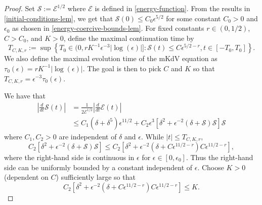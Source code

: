 \begin{proof}
	
	Set \(\mathcal S := \mathcal E ^{1/2}\) where \(\mathcal E\) is defined in \cref{energy-function}. From the results in \cref{initial-conditions-lem}, we get that \(\mathcal S(0) \leq C_0 \epsilon^{5/2}\) for some constant \(C_0 > 0\) and \(\epsilon_0\) as chosen in \cref{energy-coercive-bounds-lem}. For fixed constants \(r\in(0,1/2)\), \(C> C_0\), and \(K > 0\), define the maximal continuation time by 
	\begin{equation}
		T_{C,K,r} := \sup \left\{T_0 \in (0, r K^{-1} \epsilon^{-3} |\log(\epsilon)|]: \mathcal S(t) \leq C \epsilon^{5/2 -r}, t\in [-T_0, T_0]\right\}.
	\end{equation} 
	We also define the maximal evolution time of the mKdV equation as \(\tau_0(\epsilon) = rK^{-1}|\log(\epsilon)|\). The goal is then to pick \(C\) and \(K\) so that \(T_{C,K,r} = \epsilon^{-3} \tau_0(\epsilon)\).
	
	We have that
	\begin{equation}
	\begin{aligned}
		\left | \frac d {dt} \mathcal S(t) \right | &= \frac 1 {2 \mathcal E ^{1/2}} \left | \frac d {dt} \mathcal E(t) \right| \\
		&\leq C_1(\delta + \delta^5) \epsilon^{11/2} + C_2 \epsilon^3\left[ \delta^2 + \epsilon^{-2}(\delta + \mathcal S) \mathcal S \right]\mathcal S
	\end{aligned}
	\end{equation}
	where \(C_1, C_2 > 0\) are independent of \(\delta\) and \(\epsilon\). While \(|t| \leq T_{C,K,r}\),
	\begin{equation}
		C_2 \left[ \delta^2 + \epsilon^{-2}(\delta + \mathcal S) \mathcal S \right] \leq C_2 \left[ \delta^2  + \epsilon^{-2}(\delta +  C\epsilon^{11/2-r}) C \epsilon^{11/2-r} \right],
	\end{equation}
	where the right-hand side is continuous in \(\epsilon \) for \(\epsilon \in [0,\epsilon_0]\). Thus the right-hand side can be uniformly bounded by a constant independent of \(\epsilon\). Choose \(K>0\) (dependent on \(C\)) sufficiently large so that 
	\begin{equation}\label{K-def}
		C_2 \left[ \delta^2  + \epsilon^{-2}(\delta +  C\epsilon^{11/2-r}) C \epsilon^{11/2-r} \right] \leq K.
	\end{equation}


\end{proof}

